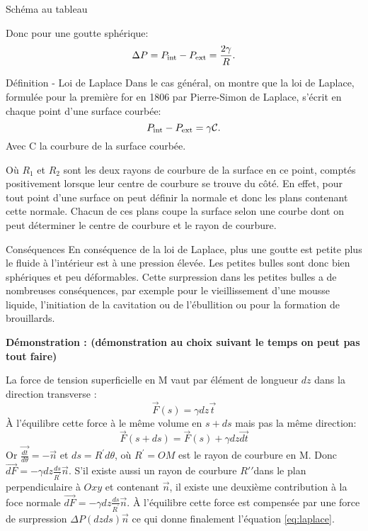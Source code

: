 \documentclass[french, a4paper, 10pt, twocolumn, landscape]{article}
\begin{document}
Schéma au tableau

Donc pour une goutte sph{\'e}rique:
\begin{equation}
  \Delta P = P_{\rm int} - P_{\rm ext} = \dfrac{2 \gamma}{R} .
\end{equation}

\begin{definition}{Définition - Loi de Laplace}
Dans le cas g{\'e}n{\'e}ral, on montre que la loi de Laplace, formul{\'e}e pour la premi{\`e}re for en 1806 par Pierre-Simon de Laplace, s'{\'e}crit en chaque point d'une surface courb{\'e}e:
  \begin{equation}
    P_{\rm int} - P_{\rm ext} = \gamma \mathbb{\mathcal{C}} .
    \label{eq:laplace}
  \end{equation}
  Avec  C  la courbure de la surface courb{\'e}e.
\end{definition}

O{\`u} $R_1$ et $R_2$ sont les deux rayons de courbure de la surface en ce point, compt{\'e}s positivement lorsque leur centre de courbure se trouve du c{\^o}t{\'e}. En effet, pour tout point d'une surface on peut d{\'e}finir la normale et donc les plans contenant cette normale. Chacun de ces plans coupe la surface selon une courbe dont on peut d{\'e}terminer le centre de courbure et le rayon de courbure.


\begin{definition}{Conséquences}
  En cons{\'e}quence de la loi de Laplace, plus une goutte est petite plus le
  fluide {\`a} l'int{\'e}rieur est {\`a} une pression {\'e}lev{\'e}e. Les
  petites bulles sont donc bien sph{\'e}riques et peu d{\'e}formables. Cette
  surpression dans les petites bulles a de nombreuses cons{\'e}quences, par
  exemple pour le vieillissement d'une mousse liquide, l'initiation de la
  cavitation ou de l'{\'e}bullition ou pour la formation de brouillards.
\end{definition}

\noindent\textbf{D{\'e}monstration : (d{\'e}monstration au choix suivant le temps on
peut pas tout faire)}

La force de tension superficielle en M vaut par {\'e}l{\'e}ment de longueur $d z$ dans la direction transverse :
\begin{equation}
  \vec{F} (s) = \gamma d z \vec{t}
\end{equation}  
{\`A} l'{\'e}quilibre cette force {\`a} le m{\^e}me volume en $s + d s$ mais pas la m{\^e}me direction:
\begin{equation}
  \vec{F} (s + d s) = \vec{F} (s) + \gamma d z \overrightarrow{d t}
\end{equation} 
 Or $\overrightarrow{\frac{d t}{d \theta}} = - \vec{n}$ et $d s = R^\prime d\theta$, o{\`u} $R^\prime = O M$ est le rayon de courbure en M. Donc
$\overrightarrow{d F} = - \gamma d z \frac{d s}{R^\prime} \vec{n}$. S'il existe
aussi un rayon de courbure $R\prime'$dans le plan perpendiculaire {\`a}
$Oxy$ et contenant $\vec{n}$, il existe une deuxi{\`e}me contribution
{\`a} la foce normale $\overrightarrow{d F} = - \gamma d z \frac{ds}{R^\prime} \vec{n}$. {\`A} l'{\'e}quilibre cette force est compens{\'e}e par une force de surpression $\Delta P (d z d s) \vec{n}$ ce qui donne finalement l'{\'e}quation \ref{eq:laplace}.\medskip
\end{document}
